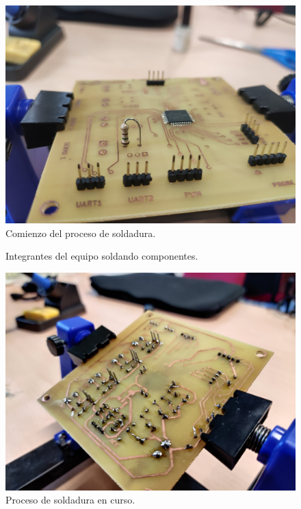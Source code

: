 \begin{enumerate}
    \begin{figure}[H]
    \centering 
    \includegraphics[width=0.55\linewidth]{pictures/PreSoldado.jpg}
    \caption{Comienzo del proceso de soldadura.}
    \end{figure}
    
    \begin{figure}[H]
    \centering
    \hfill
    \caption{Integrantes del equipo soldando componentes.}
    \end{figure}
    

    \begin{figure}[H]
    \centering 
    \includegraphics[width=0.45\linewidth]{pictures/PreSoldado2.jpg}
    \caption{Proceso de soldadura en curso.}
    \end{figure}
    

\end{enumerate}
